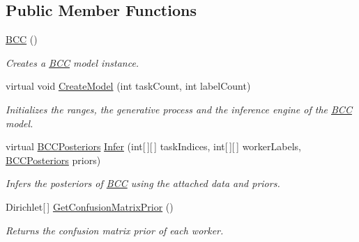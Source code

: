 \subsection*{Public Member Functions}
\begin{DoxyCompactItemize}
\item 
\hyperlink{class_crowdsourcing_models_1_1_b_c_c_aa8e876e451624f41cce4af6f38c3baf2}{B\+C\+C} ()
\begin{DoxyCompactList}\small\item\em Creates a \hyperlink{class_crowdsourcing_models_1_1_b_c_c}{B\+C\+C} model instance. \end{DoxyCompactList}\item 
virtual void \hyperlink{class_crowdsourcing_models_1_1_b_c_c_a7940c454f99a2b108723e8fcc49e035f}{Create\+Model} (int task\+Count, int label\+Count)
\begin{DoxyCompactList}\small\item\em Initializes the ranges, the generative process and the inference engine of the \hyperlink{class_crowdsourcing_models_1_1_b_c_c}{B\+C\+C} model. \end{DoxyCompactList}\item 
virtual \hyperlink{class_crowdsourcing_models_1_1_b_c_c_posteriors}{B\+C\+C\+Posteriors} \hyperlink{class_crowdsourcing_models_1_1_b_c_c_afa59a76d3c6fe11db2c3c037f8cf3efc}{Infer} (int\mbox{[}$\,$\mbox{]}\mbox{[}$\,$\mbox{]} task\+Indices, int\mbox{[}$\,$\mbox{]}\mbox{[}$\,$\mbox{]} worker\+Labels, \hyperlink{class_crowdsourcing_models_1_1_b_c_c_posteriors}{B\+C\+C\+Posteriors} priors)
\begin{DoxyCompactList}\small\item\em Infers the posteriors of \hyperlink{class_crowdsourcing_models_1_1_b_c_c}{B\+C\+C} using the attached data and priors. \end{DoxyCompactList}\item 
Dirichlet\mbox{[}$\,$\mbox{]} \hyperlink{class_crowdsourcing_models_1_1_b_c_c_aa31adcf5b6b498dd0bc86baa4f96434d}{Get\+Confusion\+Matrix\+Prior} ()
\begin{DoxyCompactList}\small\item\em Returns the confusion matrix prior of each worker. \end{DoxyCompactList}\end{DoxyCompactItemize}
